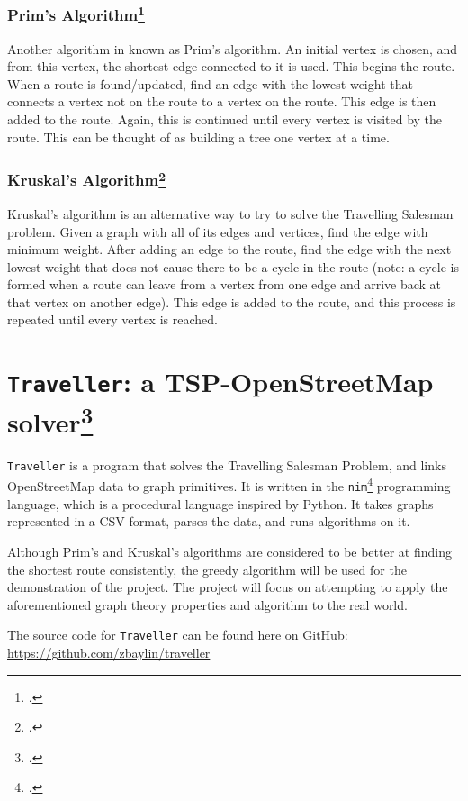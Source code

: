 \documentclass{article}
\begin{document}
  \subsubsection{Prim's Algorithm\footcite{noauthor_prims_nodate}}
    Another algorithm in known as Prim’s algorithm. An initial vertex is chosen, and from this vertex, the shortest edge connected to it is used. This begins the route. When a route is found/updated, find an edge with the lowest weight that connects a vertex not on the route to a vertex on the route. This edge is then added to the route.  Again, this is continued until every vertex is visited by the route. This can be thought of as building a tree one vertex at a time.
  \subsubsection{Kruskal's Algorithm\footcite{noauthor_kruskals_nodate}}
    Kruskal’s algorithm is an alternative way to try to solve the Travelling Salesman problem. Given a graph with all of its edges and vertices, find the edge with minimum weight. After adding an edge to the route, find the edge with the next lowest weight that does not cause there to be a cycle in the route (note: a cycle is formed when a route can leave from a vertex from one edge and arrive back at that vertex on another edge). This edge is added to the route, and this process is repeated until every vertex is reached.
  \section{\texttt{Traveller}: a TSP-OpenStreetMap solver\footcite{baylin_traveller_nodate}}
    \texttt{Traveller} is a program that solves the Travelling Salesman Problem, and links OpenStreetMap data to graph primitives. It is written in the \texttt{nim}\footcite{rumpf_nim_2019} programming language, which is a procedural language inspired by Python. It takes graphs represented in a CSV format, parses the data, and runs algorithms on it.
    \par Although Prim’s and Kruskal’s algorithms are considered to be better at finding the shortest route consistently, the greedy algorithm will be used for the demonstration of the project. The project will focus on attempting to apply the aforementioned graph theory properties and algorithm to the real world.
    \par The source code for \texttt{Traveller} can be found here on GitHub: \url{https://github.com/zbaylin/traveller}
\end{document}
